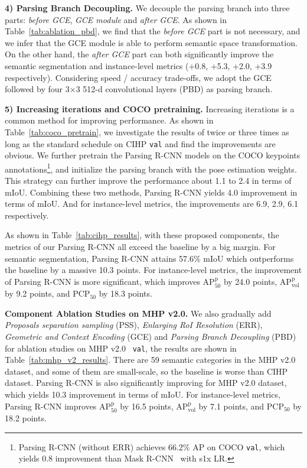 \documentclass[10pt,twocolumn,letterpaper]{article}
\begin{document}
\vspace{3pt}
\noindent\textbf{4) Parsing Branch Decoupling.} We decouple the parsing branch into three parts: \emph{before GCE},  \emph{GCE module} and  \emph{after GCE}. As shown in Table~\ref{tab:ablation_pbd}, we find that the \emph{before GCE} part is not necessary, and we infer that the GCE module is able to perform semantic space transformation. On the other hand, the \emph{after GCE} part can both significantly improve the semantic segmentation and instance-level metrics (+0.8, +5.3, +2.0, +3.9 respectively). Considering speed / accuracy trade-offs, we adopt the GCE followed by four 3$\times$3 512-d convolutional layers (PBD) as parsing branch.

\vspace{3pt}
\noindent\textbf{5) Increasing iterations and COCO pretraining.} Increasing iterations is a common method for improving performance. As shown in Table~\ref{tab:coco_pretrain}, we investigate the results of twice or three times as long as the standard schedule on CIHP \texttt{val} and find the improvements are obvious. We further pretrain the Parsing R-CNN models on the COCO keypoints annotations\footnote{\fontsize{7pt}{1em}Parsing R-CNN (without ERR) achieves 66.2\% AP on COCO \texttt{val}, which yields 0.8 improvement than Mask R-CNN~\cite{He_iccv2017_maskrcnn} with s1x LR.}, and initialize the parsing branch with the pose estimation weights. This strategy can further improve the performance about 1.1 to 2.4 in terms of mIoU. Combining these two methods, Parsing R-CNN yields 4.0 improvement in terms of mIoU. And for instance-level metrics, the improvements are 6.9, 2.9, 6.1 respectively.

As shown in Table~\ref{tab:cihp_results}, with these proposed components, the metrics of our Parsing R-CNN all exceed the baseline by a big margin. For semantic segmentation, Parsing R-CNN attains 57.6\% mIoU which outperforms the baseline by a massive 10.3 points. For instance-level metrics, the improvement of Parsing R-CNN is more significant, which improves AP$^\text{p}_\text{50}$ by 24.0 points,  AP$^\text{p}_\text{vol}$ by 9.2 points, and PCP$_\text{50}$ by 18.3 points.


\vspace{6pt}
\noindent\textbf{Component Ablation Studies on MHP v2.0.} We also gradually add \emph{Proposals separation sampling} (PSS), \emph{Enlarging RoI Resolution} (ERR), \emph{Geometric and Context Encoding} (GCE) and \emph{Parsing Branch Decoupling} (PBD) for ablation studies on MHP v2.0~\cite{Zhao_mm2018_mhpv2} \texttt{val}, the results are shown in Table~\ref{tab:mhp_v2_results}. There are 59 semantic categories in the MHP v2.0 dataset, and some of them are small-scale, so the baseline is worse than CIHP dataset. Parsing R-CNN is also significantly improving for MHP v2.0 dataset, which yields 10.3 improvement in terms of mIoU. For instance-level metrics, Parsing R-CNN improves AP$^\text{p}_\text{50}$ by 16.5 points,  AP$^\text{p}_\text{vol}$ by 7.1 points, and PCP$_\text{50}$ by 18.2 points.
\end{document}
